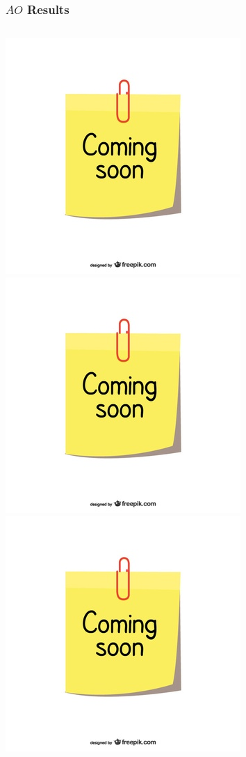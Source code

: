 \documentclass{beamer}
\begin{document}
	\begin{frame}
		\frametitle{$AO$ Results}
		\begin{columns}[t]
			\centering
			\includegraphics[scale= 0.3]{coming-soon}\\
			\includegraphics[scale= 0.3]{coming-soon}
			\centering
			\includegraphics[scale= 0.3]{coming-soon}\\

\end{columns}
\end{frame}
\end{document}
